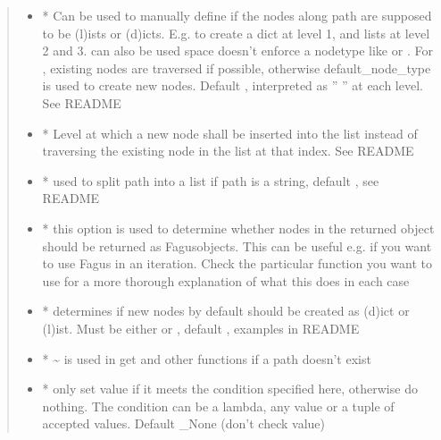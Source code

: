 \documentclass[a4paper,10pt,english]{sphinxmanual}
\begin{document}
\begin{fulllineitems}
\begin{fulllineitems}
\begin{quote}
\begin{description}
\begin{itemize}
\item {}
\sphinxAtStartPar
{} \textendash{} * Can be used to manually define if the nodes along path are supposed to be (l)ists or
(d)icts. E.g.  to create a dict at level 1, and lists at level 2 and 3.  can also be
used \textendash{} space doesn’t enforce a node\sphinxhyphen{}type like  or . For , existing nodes are
traversed if possible, otherwise default\_node\_type is used to create new nodes. Default ,
interpreted as ” ” at each level. See README

\item {}
\sphinxAtStartPar
{} \textendash{} * Level at which a new node shall be inserted into the list instead of traversing the
existing node in the list at that index. See README

\item {}
\sphinxAtStartPar
{} \textendash{} * used to split path into a list if path is a string, default , see README

\item {}
\sphinxAtStartPar
{} \textendash{} * this option is used to determine whether nodes in the returned object should be returned as
Fagus\sphinxhyphen{}objects. This can be useful e.g. if you want to use Fagus in an iteration. Check the particular
function you want to use for a more thorough explanation of what this does in each case

\item {}
\sphinxAtStartPar
{} \textendash{} * determines if new nodes by default should be created as (d)ict or (l)ist. Must be
either  or , default , examples in README

\item {}
\sphinxAtStartPar
{} \textendash{} * \textasciitilde{} is used in get and other functions if a path doesn’t exist

\item {}
\sphinxAtStartPar
{} \textendash{} * only set value if it meets the condition specified here, otherwise do nothing. The condition can be
a lambda, any value or a tuple of accepted values. Default \_None (don’t check value)


\end{itemize}
\end{description}
\end{quote}
\end{fulllineitems}
\end{fulllineitems}
\end{document}
